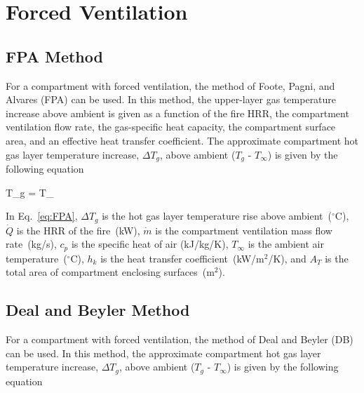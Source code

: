 %
%
%
%


\clearpage


\section{Forced Ventilation}

\subsection{FPA Method}

For a compartment with forced ventilation, the method of Foote, Pagni, and Alvares (FPA) can be used. In this method, the upper-layer gas temperature increase above ambient is given as a function of the fire HRR, the compartment ventilation flow rate, the gas-specific heat capacity, the compartment surface area, and an effective heat transfer coefficient. The approximate compartment hot gas layer temperature increase, $\Delta T_g$, above ambient ($T_g$ - $T_\infty$) is given by the following equation

\be
\Delta T_g =  T_\infty
\label{eq:FPA}
\ee

In Eq.~\ref{eq:FPA}, $\Delta T_g$ is the hot gas layer temperature rise above ambient~($^\circ$C), $\dot Q$ is the HRR of the fire~(kW), $\dot m$ is the compartment ventilation mass flow rate~(kg/s), $c_p$ is the specific heat of air (kJ/kg/K), $T_\infty$ is the ambient air temperature~($^\circ$C), $h_k$ is the heat transfer coefficient~(kW/m$^2$/K), and $A_T$ is the total area of compartment enclosing surfaces~(m$^2$).


\subsection{Deal and Beyler Method}

For a compartment with forced ventilation, the method of Deal and Beyler (DB) can be used. In this method, the approximate compartment hot gas layer temperature increase, $\Delta T_g$, above ambient ($T_g$ - $T_\infty$) is given by the following equation

